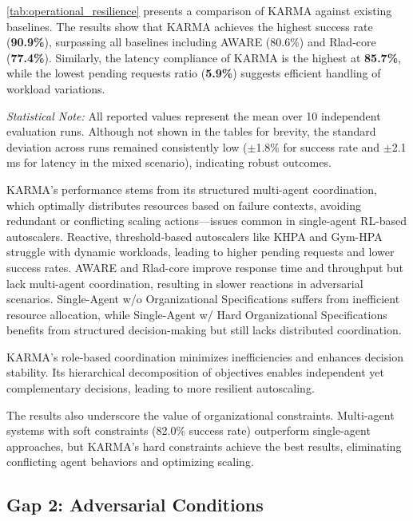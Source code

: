%
\autoref{tab:operational_resilience} presents a comparison of KARMA against existing baselines. The results show that KARMA achieves the highest success rate (\textbf{90.9\%}), surpassing all baselines including AWARE (80.6\%) and Rlad-core (\textbf{77.4\%}). Similarly, the latency compliance of KARMA is the highest at \textbf{85.7\%}, while the lowest pending requests ratio (\textbf{5.9\%}) suggests efficient handling of workload variations.

\noindent \textit{Statistical Note:} All reported values represent the mean over 10 independent evaluation runs. Although not shown in the tables for brevity, the standard deviation across runs remained consistently low ($\pm$1.8\% for success rate and $\pm$2.1 ms for latency in the mixed scenario), indicating robust outcomes.

KARMA's performance stems from its structured multi-agent coordination, which optimally distributes resources based on failure contexts, avoiding redundant or conflicting scaling actions—issues common in single-agent RL-based autoscalers.
%
Reactive, threshold-based autoscalers like KHPA and Gym-HPA struggle with dynamic workloads, leading to higher pending requests and lower success rates. AWARE and Rlad-core improve response time and throughput but lack multi-agent coordination, resulting in slower reactions in adversarial scenarios. Single-Agent w/o Organizational Specifications suffers from inefficient resource allocation, while Single-Agent w/ Hard Organizational Specifications benefits from structured decision-making but still lacks distributed coordination.

KARMA's role-based coordination minimizes inefficiencies and enhances decision stability. Its hierarchical decomposition of objectives enables independent yet complementary decisions, leading to more resilient autoscaling.

The results also underscore the value of organizational constraints. Multi-agent systems with soft constraints (82.0\% success rate) outperform single-agent approaches, but KARMA's hard constraints achieve the best results, eliminating conflicting agent behaviors and optimizing scaling.



\subsection{Gap 2: Adversarial Conditions}

